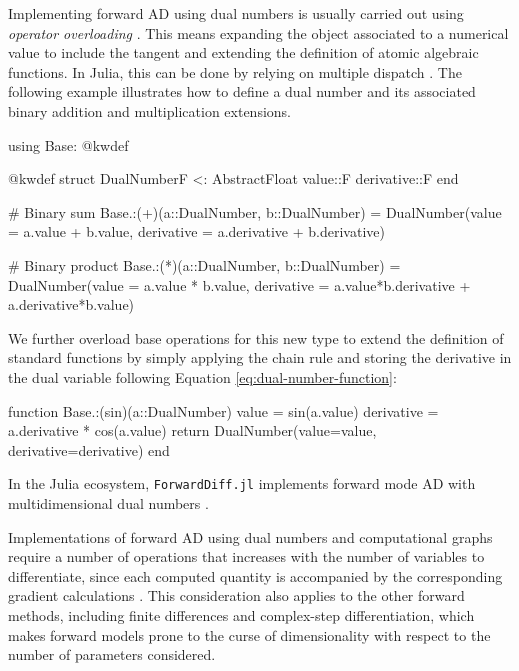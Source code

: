 Implementing forward AD using dual numbers is usually carried out using \textit{operator overloading} \cite{Neuenhofen_2018}. 
This means expanding the object associated to a numerical value to include the tangent and extending the definition of atomic algebraic functions. 
In Julia, this can be done by relying on multiple dispatch \cite{Julialang_2017}. 
The following example illustrates how to define a dual number and its associated binary addition and multiplication extensions. 
\begin{jllisting}
using Base: @kwdef

@kwdef struct DualNumber{F <: AbstractFloat}
    value::F
    derivative::F
end

# Binary sum
Base.:(+)(a::DualNumber, b::DualNumber) = DualNumber(value = a.value + b.value, derivative = a.derivative + b.derivative)

# Binary product 
Base.:(*)(a::DualNumber, b::DualNumber) = DualNumber(value = a.value * b.value, derivative = a.value*b.derivative + a.derivative*b.value)
\end{jllisting}
We further overload base operations for this new type to extend the definition of standard functions by simply applying the chain rule and storing the derivative in the dual variable following Equation \eqref{eq:dual-number-function}:
\begin{jllisting}
function Base.:(sin)(a::DualNumber)
    value = sin(a.value)
    derivative = a.derivative * cos(a.value)
    return DualNumber(value=value, derivative=derivative)
end
\end{jllisting}
In the Julia ecosystem, \texttt{ForwardDiff.jl} implements forward mode AD with multidimensional dual numbers \cite{RevelsLubinPapamarkou2016}. 

Implementations of forward AD using dual numbers and computational graphs require a number of operations that increases with the number of variables to differentiate, since each computed quantity is accompanied by the corresponding gradient calculations \cite{Griewank_1989}. 
This consideration also applies to the other forward methods, including finite differences and complex-step differentiation, which makes forward models prone to the curse of dimensionality with respect to the number of parameters considered.

